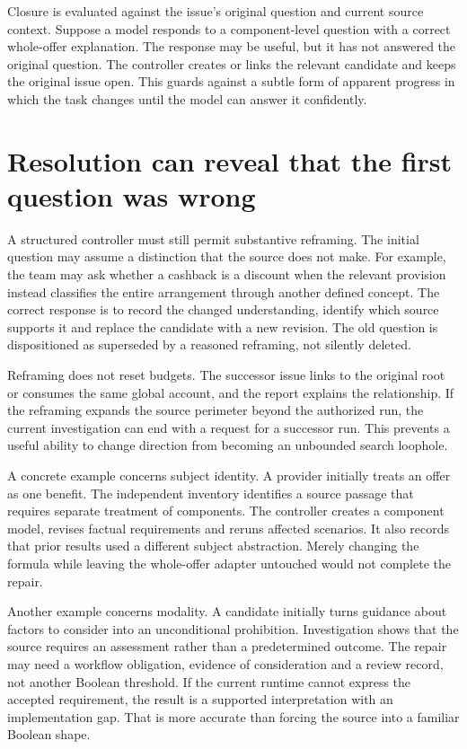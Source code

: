 Closure is evaluated against the issue's original question and current source
context. Suppose a model responds to a component-level question with a correct
whole-offer explanation. The response may be useful, but it has not answered the
original question. The controller creates or links the relevant candidate and
keeps the original issue open. This guards against a subtle form of apparent
progress in which the task changes until the model can answer it confidently.

\section{Resolution can reveal that the first question was wrong}
\label{merge:M06:10}


A structured controller must still permit substantive reframing. The initial
question may assume a distinction that the source does not make. For example,
the team may ask whether a cashback is a discount when the relevant provision
instead classifies the entire arrangement through another defined concept.
The correct response is to record the changed understanding, identify which
source supports it and replace the candidate with a new revision. The old question
is dispositioned as superseded by a reasoned reframing, not silently deleted.

Reframing does not reset budgets. The successor issue links to the original root
or consumes the same global account, and the report explains the relationship.
If the reframing expands the source perimeter beyond the authorized run, the
current investigation can end with a request for a successor run. This prevents a
useful ability to change direction from becoming an unbounded search loophole.


A concrete example concerns subject identity. A provider initially treats an
offer as one benefit. The independent inventory identifies a source passage that
requires separate treatment of components. The controller creates a component
model, revises factual requirements and reruns affected scenarios. It also records
that prior results used a different subject abstraction. Merely changing the
formula while leaving the whole-offer adapter untouched would not complete the
repair.

Another example concerns modality. A candidate initially turns guidance about
factors to consider into an unconditional prohibition. Investigation shows that
the source requires an assessment rather than a predetermined outcome. The repair
may need a workflow obligation, evidence of consideration and a review record,
not another Boolean threshold. If the current runtime cannot express the accepted
requirement, the result is a supported interpretation with an implementation gap.
That is more accurate than forcing the source into a familiar Boolean shape.

